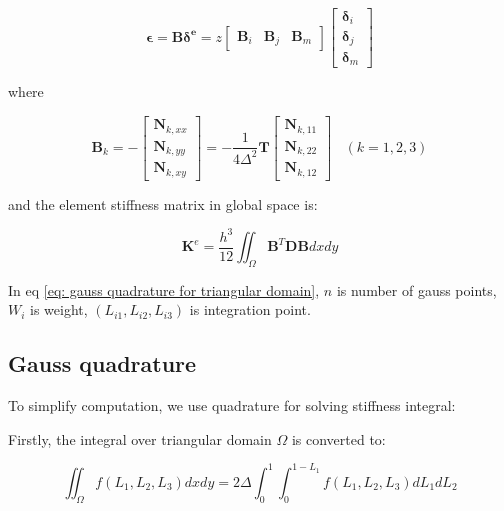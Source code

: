 \begin{equation}\label{key}
\mathbf{\epsilon} = \mathbf{B} \mathbf{\delta^e} = z \begin{bmatrix}
\mathbf{B}_i & \mathbf{B}_j & \mathbf{B}_m
\end{bmatrix} \begin{bmatrix}
\mathbf{\delta}_i \\ 
\mathbf{\delta}_j \\ 
\mathbf{\delta}_m
\end{bmatrix} 
\end{equation}

where

\begin{equation}\label{key}
\mathbf{B}_k = -\begin{bmatrix}
\mathbf{N}_{k,xx} \\ 
\mathbf{N}_{k,yy} \\ 
\mathbf{N}_{k,xy}
\end{bmatrix} = - \frac{1}{4 \Delta^2} \mathbf{T} \begin{bmatrix}
\mathbf{N}_{k,11} \\ 
\mathbf{N}_{k,22} \\ 
\mathbf{N}_{k,12}
\end{bmatrix}~~~~ (k=1,2,3)
\end{equation}

and the element stiffness matrix   in global space is:

\begin{equation}\label{eq: gauss quadrature for triangular domain}
\mathbf{K}^e = \frac{h^3}{12} \iint_\Omega \mathbf{B}^T \mathbf{DB} dx dy
\end{equation}

In eq \ref{eq: gauss quadrature for triangular domain}, $ n $ is number of gauss points, $ W_i $ is weight, $ (L_{i1}, L_{i2}, L_{i3}) $ is integration point.

\subsection{Gauss quadrature}
To simplify computation, we use quadrature for solving stiffness integral:

Firstly, the integral over triangular domain $ \Omega $ is converted to:

\begin{equation}\label{key}
\iint_\Omega f(L_1, L_2, L_3) dx dy = 2 \Delta \int_{0}^{1} \int_{0}^{1-L_1} f(L_1, L_2, L_3) dL_1 dL_2
\end{equation}

